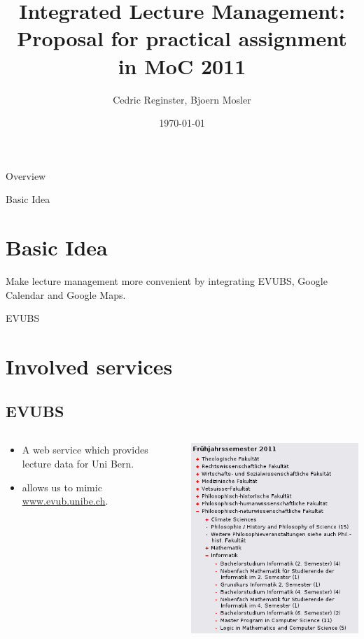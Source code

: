 \documentclass{beamer}
\title[Integrated Lecture Management]{Integrated Lecture Management: Proposal for practical assignment in MoC 2011}
\date{\today}
\institute{IAM}
\author{Cedric Reginster, Bjoern Mosler}
\begin{document}
\begin{frame}
	\titlepage
\end{frame}


\begin{frame}{Overview}
	\tableofcontents
\end{frame}

\begin{frame}{Basic Idea}

	\section{Basic Idea}
	Make lecture management more convenient by integrating EVUBS, Google Calendar and Google Maps.

\end{frame}

\begin{frame}{EVUBS}

	\section{Involved services}
	\subsection{EVUBS}

	\begin{columns}
		\begin{column}{0.5\textwidth}
			\begin{itemize}
				\item A web service which provides lecture data for Uni Bern.
				\item allows us to mimic \url{www.evub.unibe.ch}.
			\end{itemize}
		\end{column}

		\begin{column}{0.5\textwidth}
			\includegraphics[scale=0.5]{evub.png} 
		\end{column}
	\end{columns}

\end{frame}
\end{document}
